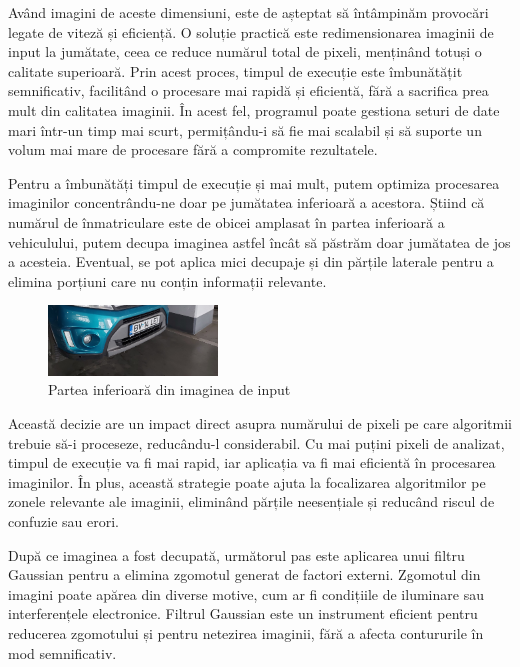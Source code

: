 \documentclass[a4paper,12pt]{report}
\begin{document}
Având imagini de aceste dimensiuni, este de așteptat să întâmpinăm provocări legate de viteză și eficiență. O soluție practică este redimensionarea imaginii de input la jumătate, ceea ce reduce numărul total de pixeli, menținând totuși o calitate superioară. Prin acest proces, timpul de execuție este îmbunătățit semnificativ, facilitând o procesare mai rapidă și eficientă, fără a sacrifica prea mult din calitatea imaginii. În acest fel, programul poate gestiona seturi de date mari într-un timp mai scurt, permițându-i să fie mai scalabil și să suporte un volum mai mare de procesare fără a compromite rezultatele.

Pentru a îmbunătăți timpul de execuție și mai mult, putem optimiza procesarea imaginilor concentrându-ne doar pe jumătatea inferioară a acestora. Știind că numărul de înmatriculare este de obicei amplasat în partea inferioară a vehiculului, putem decupa imaginea astfel încât să păstrăm doar jumătatea de jos a acesteia. Eventual, se pot aplica mici decupaje și din părțile laterale pentru a elimina porțiuni care nu conțin informații relevante.

\begin{figure}[h!]
    \centering
    \includegraphics[width=0.4\textwidth]{images/crop.jpg}
    \caption{Partea inferioară din imaginea de input}
\end{figure}
\FloatBarrier

Această decizie are un impact direct asupra numărului de pixeli pe care algoritmii trebuie să-i proceseze, reducându-l considerabil. Cu mai puțini pixeli de analizat, timpul de execuție va fi mai rapid, iar aplicația va fi mai eficientă în procesarea imaginilor. În plus, această strategie poate ajuta la focalizarea algoritmilor pe zonele relevante ale imaginii, eliminând părțile neesențiale și reducând riscul de confuzie sau erori.

După ce imaginea a fost decupată, următorul pas este aplicarea unui filtru Gaussian pentru a elimina zgomotul generat de factori externi. Zgomotul din imagini poate apărea din diverse motive, cum ar fi condițiile de iluminare sau interferențele electronice. Filtrul Gaussian este un instrument eficient pentru reducerea zgomotului și pentru netezirea imaginii, fără a afecta contururile în mod semnificativ.
\end{document}
